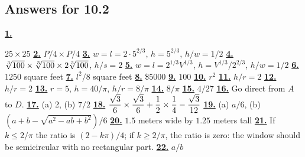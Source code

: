 \subsection *{Answers for 10.2}
\hypertarget {a:10.2.1}{\hyperlink {e:10.2.1}{\bfseries 1.}} \mdseries $25\times 25$\qquad 
\hypertarget {a:10.2.2}{\hyperlink {e:10.2.2}{\bfseries 2.}} \mdseries $P/4\times P/4$\qquad 
\hypertarget {a:10.2.3}{\hyperlink {e:10.2.3}{\bfseries 3.}} \mdseries $w=l=2\cdot 5^{2/3}$, $h=5^{2/3}$, $h/w=1/2$\qquad 
\hypertarget {a:10.2.4}{\hyperlink {e:10.2.4}{\bfseries 4.}} \mdseries $\root 3\of {100}\times \root 3\of {100}\times 2\root 3\of {100}$, $h/s=2$\qquad 
\hypertarget {a:10.2.5}{\hyperlink {e:10.2.5}{\bfseries 5.}} \mdseries $w=l=2^{1/3}V^{1/3}$, $h=V^{1/3}/2^{2/3}$, $h/w=1/2$\qquad 
\hypertarget {a:10.2.6}{\hyperlink {e:10.2.6}{\bfseries 6.}} \mdseries $1250$ square feet\qquad 
\hypertarget {a:10.2.7}{\hyperlink {e:10.2.7}{\bfseries 7.}} \mdseries $l^2/8$ square feet\qquad 
\hypertarget {a:10.2.8}{\hyperlink {e:10.2.8}{\bfseries 8.}} \mdseries \$5000\qquad 
\hypertarget {a:10.2.9}{\hyperlink {e:10.2.9}{\bfseries 9.}} \mdseries $100$\qquad 
\hypertarget {a:10.2.10}{\hyperlink {e:10.2.10}{\bfseries 10.}} \mdseries $r^2$\qquad 
\hypertarget {a:10.2.11}{\hyperlink {e:10.2.11}{\bfseries 11.}} \mdseries $h/r=2$\qquad 
\hypertarget {a:10.2.12}{\hyperlink {e:10.2.12}{\bfseries 12.}} \mdseries $h/r=2$\qquad 
\hypertarget {a:10.2.13}{\hyperlink {e:10.2.13}{\bfseries 13.}} \mdseries $r=5$, $h=40/\pi $, $h/r=8/\pi $\qquad 
\hypertarget {a:10.2.14}{\hyperlink {e:10.2.14}{\bfseries 14.}} \mdseries $8/\pi $\qquad 
\hypertarget {a:10.2.15}{\hyperlink {e:10.2.15}{\bfseries 15.}} \mdseries $4/27$\qquad 
\hypertarget {a:10.2.16}{\hyperlink {e:10.2.16}{\bfseries 16.}} \mdseries Go direct from $A$ to $D$.\qquad 
\hypertarget {a:10.2.17}{\hyperlink {e:10.2.17}{\bfseries 17.}} \mdseries (a) 2, (b) $7/2$\qquad 
\hypertarget {a:10.2.18}{\hyperlink {e:10.2.18}{\bfseries 18.}} \mdseries $\displaystyle {\sqrt 3\over 6}\times {\sqrt 3\over 6}+{1\over 2}\times {1\over 4}-{\sqrt 3\over 12}$\qquad 
\hypertarget {a:10.2.19}{\hyperlink {e:10.2.19}{\bfseries 19.}} \mdseries (a) $a/6$, (b) $(a+b-\sqrt {a^2-ab+b^2})/6$\qquad 
\hypertarget {a:10.2.20}{\hyperlink {e:10.2.20}{\bfseries 20.}} \mdseries $1.5$ meters wide by $1.25$ meters tall\qquad 
\hypertarget {a:10.2.21}{\hyperlink {e:10.2.21}{\bfseries 21.}} \mdseries If $k\le 2/\pi $ the ratio is $(2-k\pi )/4$; if $k\ge 2/\pi $, the ratio is zero: the window should be semicircular with no rectangular part.\qquad 
\hypertarget {a:10.2.22}{\hyperlink {e:10.2.22}{\bfseries 22.}} \mdseries $a/b$\qquad 
